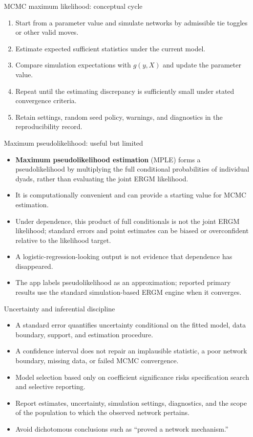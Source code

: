 \documentclass[aspectratio=169,11pt]{beamer}
\newcommand{\term}[1]{\textbf{\color{nupurple}#1}}
\begin{document}
\begin{frame}{MCMC maximum likelihood: conceptual cycle}
\begin{enumerate}
\item Start from a parameter value and simulate networks by admissible tie toggles or other valid moves.
\item Estimate expected sufficient statistics under the current model.
\item Compare simulation expectations with $g(y,X)$ and update the parameter value.
\item Repeat until the estimating discrepancy is sufficiently small under stated convergence criteria.
\item Retain settings, random seed policy, warnings, and diagnostics in the reproducibility record.
\end{enumerate}
\end{frame}

\begin{frame}{Maximum pseudolikelihood: useful but limited}
\begin{itemize}
\item \term{Maximum pseudolikelihood estimation} (MPLE) forms a pseudolikelihood by multiplying the full conditional probabilities of individual dyads, rather than evaluating the joint ERGM likelihood.
\item It is computationally convenient and can provide a starting value for MCMC estimation.
\item Under dependence, this product of full conditionals is not the joint ERGM likelihood; standard errors and point estimates can be biased or overconfident relative to the likelihood target.
\item A logistic-regression-looking output is not evidence that dependence has disappeared.
\item The app labels pseudolikelihood as an approximation; reported primary results use the standard simulation-based ERGM engine when it converges.
\end{itemize}
\end{frame}

\begin{frame}{Uncertainty and inferential discipline}
\begin{itemize}
\item A standard error quantifies uncertainty conditional on the fitted model, data boundary, support, and estimation procedure.
\item A confidence interval does not repair an implausible statistic, a poor network boundary, missing data, or failed MCMC convergence.
\item Model selection based only on coefficient significance risks specification search and selective reporting.
\item Report estimates, uncertainty, simulation settings, diagnostics, and the scope of the population to which the observed network pertains.
\item Avoid dichotomous conclusions such as ``proved a network mechanism.''
\end{itemize}
\end{frame}
\end{document}
